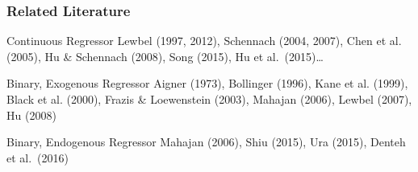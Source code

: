 \documentclass{beamer}
\begin{document}
%   
\begin{frame}[label=MAHAJAN_BODY]
  \frametitle{Related Literature}
 
  \begin{block}{Continuous Regressor}
    \small
  Lewbel (1997, 2012), Schennach (2004, 2007), Chen et al. (2005), Hu \& Schennach (2008), Song (2015), Hu et al.\ (2015)\ldots 
  \end{block}

  \begin{block}{Binary, Exogenous Regressor}
    \small
   Aigner (1973), Bollinger (1996), Kane et al. (1999), Black et al. (2000), Frazis \& Loewenstein (2003), Mahajan (2006), Lewbel (2007), Hu (2008)
  \end{block}

  \begin{block}{Binary, Endogenous Regressor}
    \alert{Mahajan (2006)}, \small Shiu (2015), Ura (2015), Denteh et al.\ (2016)  
  \end{block}
\end{frame}
\end{document}
